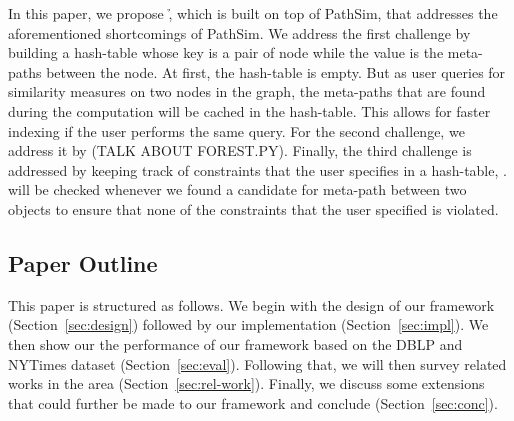 In this paper, we propose \h, which is built on top of PathSim, that addresses
the aforementioned shortcomings of PathSim. We address the first challenge
by building a hash-table whose key is a pair of node while the value is
the meta-paths between the node. At first, the hash-table is empty. But as
user queries for similarity measures on two nodes in the graph, the meta-paths
that are found during the computation will be cached in the hash-table. This
allows for faster indexing if the user performs the same query. For the
second challenge, we address it by (TALK ABOUT FOREST.PY). Finally,
the third challenge is addressed by keeping track of constraints that
the user specifies in a hash-table, \constraint. \constraint will be
checked whenever we found a candidate for meta-path between two objects
to ensure that none of the constraints that the user specified is
violated.

\subsection{Paper Outline}

This paper is structured as follows. We begin with the design of our framework
(Section~\ref{sec:design}) followed by our implementation (Section~\ref{sec:impl}). We then show our the performance of our framework
based on the DBLP and NYTimes dataset (Section~\ref{sec:eval}). Following that,
we will then survey related works in the area (Section~\ref{sec:rel-work}).
Finally, we discuss some extensions that could further be made to our framework
and conclude (Section~\ref{sec:conc}).
